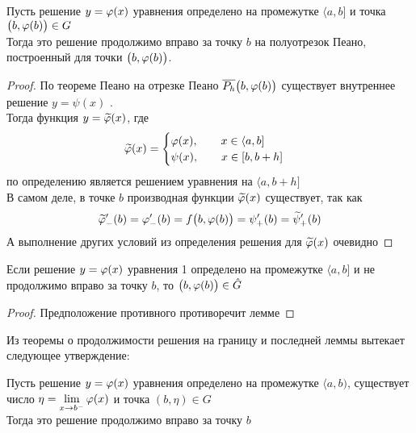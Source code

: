 \begin{lemma}
    Пусть решение $ y = \varphi(x) $ уравнения  определено на промежутке $ \langle a, b] $ и точка $ \big( b, \varphi(b) \big) \in G $ \\
    Тогда это решение продолжимо вправо за точку $ b $ на полуотрезок Пеано, построенный для точки $ \big( b, \varphi(b) \big) $.
\end{lemma}

\begin{proof}
    По теореме Пеано на отрезке Пеано $ \overline{P_h} \big( b, \varphi(b) \big) $ существует внутреннее решение $ y = \psi(x) $ . \\
    Тогда функция $ y = \widetilde{\varphi}(x) $, где
    $$ \widetilde{\varphi}(x) =
    \begin{cases}
        \varphi(x), \qquad x \in \langle a, b] \\
        \psi(x), \qquad x \in [b, b + h]
    \end{cases} $$
    по определению является решением уравнения  на $ \langle a, b + h] $ \\
    В самом деле, в точке $ b $ производная функции $ \widetilde{\varphi}(x) $ существует, так как
    $$ \widetilde{\varphi}_-'(b) = \varphi_-'(b) = f \big( b, \varphi(b) \big) = \psi_+'(b) = \widetilde\psi_+'(b) $$
    А выполнение других условий из определения решения для $ \widetilde{\varphi}(x) $ очевидно
\end{proof}

\begin{implication}
    Если решение $ y = \varphi(x) $ уравнения 1 определено на промежутке $ \langle a, b] $ и не продолжимо вправо за точку $ b $, то $ \big( b, \varphi(b) \big) \in \hat{G} $
\end{implication}

\begin{proof}
	Предположение противного противоречит лемме
\end{proof}

Из теоремы о продолжимости решения на границу и последней леммы вытекает следующее утверждение:

\begin{lemma}
    Пусть решение $ y = \varphi(x) $ уравнения  определено на промежутке $ \langle a, b) $, существует число $ \eta = \lim\limits_{x \to b^-}\varphi(x) $ и точка $ (b, \eta) \in G $ \\
    Тогда это решение продолжимо вправо за точку $ b $
\end{lemma}

